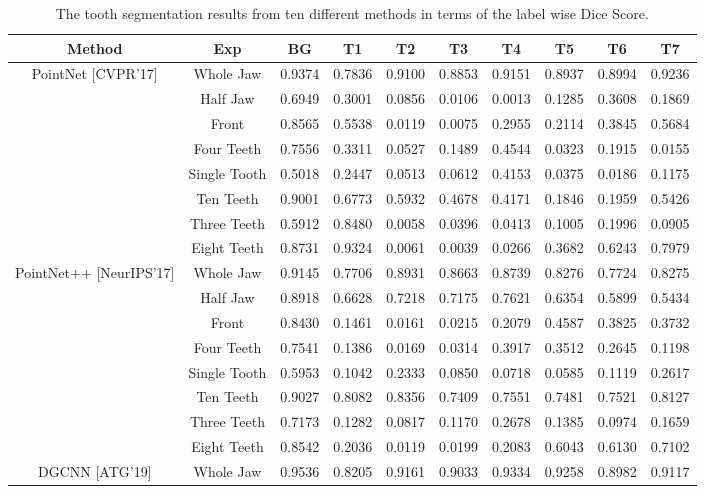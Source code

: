 \documentclass[letterpaper, 10 pt, conference]{ieeeconf}  %
\begin{document}
\begin{table*}[htbp]
\centering
\scriptsize
\caption {The tooth segmentation results from ten different methods in terms of the label wise Dice Score.}
\begin{tabular}{|c|c|c|c|c |c |c |c |c |c|}
\hline
Method  & Exp & BG & T1 & T2 & T3 &  T4 & T5 & T6 & T7  \\ \hline
{PointNet [CVPR'17]} & Whole Jaw & 0.9374 & 0.7836 & 0.9100 & 0.8853 & 0.9151 & 0.8937 & 0.8994 & 0.9236\\
& Half Jaw & 0.6949 & 0.3001 & 0.0856 & 0.0106 & 0.0013 & 0.1285 & 0.3608 & 0.1869 \\
& Front & 0.8565 & 0.5538 & 0.0119 & 0.0075 & 0.2955 & 0.2114 & 0.3845 & 0.5684 \\
& Four Teeth & 0.7556 & 0.3311 & 0.0527 & 0.1489 & 0.4544 & 0.0323 & 0.1915 & 0.0155\\
& Single Tooth & 0.5018 & 0.2447 & 0.0513 & 0.0612 & 0.4153 & 0.0375 & 0.0186 & 0.1175\\
& Ten Teeth & 0.9001& 0.6773& 0.5932& 0.4678& 0.4171& 0.1846& 0.1959& 0.5426\\
& Three Teeth & 0.5912& 0.8480& 0.0058& 0.0396& 0.0413& 0.1005& 0.1996& 0.0905 \\
& Eight Teeth & 0.8731& 0.9324& 0.0061& 0.0039& 0.0266& 0.3682& 0.6243& 0.7979\\
\hline
{PointNet++ [NeurIPS'17]} & Whole Jaw & 0.9145 & 0.7706 & 0.8931 & 0.8663 & 0.8739 & 0.8276 & 0.7724 & 0.8275 \\ %
& Half Jaw & 0.8918 & 0.6628 & 0.7218 & 0.7175 & 0.7621 & 0.6354 & 0.5899 & 0.5434\\
& Front & 0.8430 & 0.1461 & 0.0161 & 0.0215 & 0.2079 & 0.4587 & 0.3825 & 0.3732 \\
& Four Teeth & 0.7541 & 0.1386 & 0.0169 & 0.0314 & 0.3917 & 0.3512 & 0.2645 & 0.1198 \\
& Single Tooth & 0.5953 & 0.1042 & 0.2333 & 0.0850 & 0.0718 & 0.0585 & 0.1119 & 0.2617\\
& Ten Teeth & 0.9027& 0.8082& 0.8356& 0.7409& 0.7551& 0.7481& 0.7521& 0.8127 \\
& Three Teeth & 0.7173& 0.1282& 0.0817& 0.1170& 0.2678& 0.1385& 0.0974& 0.1659\\
& Eight Teeth & 0.8542& 0.2036& 0.0119& 0.0199& 0.2083& 0.6043& 0.6130& 0.7102\\
\hline
{DGCNN [ATG'19]}  & Whole Jaw & 0.9536 & 0.8205 & 0.9161 & 0.9033 & 0.9334 & 0.9258 & 0.8982 & 0.9117\\

\end{tabular}
\end{table*}
\end{document}
